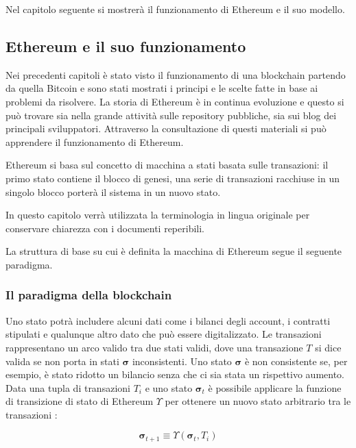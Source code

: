 	Nel capitolo seguente si mostrerà il funzionamento di Ethereum e il suo modello.
	
	
	
	\subsection{Ethereum e il suo funzionamento}%
	Nei precedenti capitoli è stato visto il funzionamento di una blockchain partendo da quella Bitcoin e sono stati mostrati i principi e le scelte fatte in base ai problemi da risolvere. 
	La storia di Ethereum è in continua evoluzione e questo si può trovare sia nella grande attività sulle repository pubbliche, sia sui blog dei principali sviluppatori. Attraverso la consultazione di questi materiali si può apprendere il funzionamento di Ethereum.
	
	Ethereum si basa sul concetto di macchina a stati basata sulle transazioni: il primo stato contiene il blocco di genesi, una serie di transazioni racchiuse in un singolo blocco porterà il sistema in un nuovo stato. 
	
	In questo capitolo verrà utilizzata la terminologia in lingua originale per conservare chiarezza con i documenti reperibili.
	
	La struttura di base su cui è definita la macchina di Ethereum segue il seguente paradigma.
	
	\subsubsection{Il paradigma della blockchain}
	
	Uno stato potrà includere alcuni dati come i bilanci degli account, i contratti stipulati e qualunque altro dato che può essere digitalizzato.
	Le transazioni rappresentano un arco valido tra due stati validi, dove una transazione $T$ si dice valida se non porta in stati $\boldsymbol{\sigma}$ inconsistenti. Uno stato $\boldsymbol{\sigma}$ è non consistente se, per esempio, è stato ridotto un bilancio senza che ci sia stata un rispettivo aumento.
	Data una tupla di transazioni $T_i$ e uno stato $\boldsymbol{\sigma}_t$ è possibile applicare la funzione di transizione di stato di Ethereum $\Upsilon$ per ottenere un nuovo stato arbitrario tra le transazioni :
	
	\begin{equation}
	\boldsymbol{\sigma}_{t+1} \equiv \Upsilon(\boldsymbol{\sigma}_t, T_i)
	\end{equation}
	
